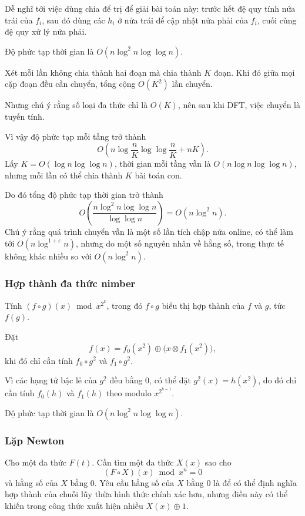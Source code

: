 \documentclass[11pt]{article}
\begin{document}
Dễ nghĩ tới việc dùng chia để trị để giải bài toán này: trước hết đệ quy tính
nửa trái của \(f_i\), sau đó dùng các \(h_i\) ở nửa trái để cập nhật nửa phải
của \(f_i\), cuối cùng đệ quy xử lý nửa phải.

Độ phức tạp thời gian là \(O(n\log^2 n\log\log n)\).

Xét mỗi lần không chia thành hai đoạn mà chia thành \(K\) đoạn. Khi đó giữa mọi
cặp đoạn đều cần chuyển, tổng cộng \(O(K^2)\) lần chuyển.

Nhưng chú ý rằng số loại đa thức chỉ là \(O(K)\), nên sau khi DFT, việc chuyển
là tuyến tính.

Vì vậy độ phức tạp mỗi tầng trở thành
\[
  O\left(n\log\frac nK\log\log\frac nK+nK\right).
\]
Lấy \(K=O(\log n\log\log n)\), thời gian mỗi tầng vẫn là \(O(n\log n\log\log n)\),
nhưng mỗi lần có thể chia thành \(K\) bài toán con.

Do đó tổng độ phức tạp thời gian trở thành
\[
  O\left(\frac{n\log^2 n\log\log n}{\log\log n}\right)=O(n\log^2 n).
\]
Chú ý rằng quá trình chuyển vẫn là một số lần tích chập nửa online, có thể làm
tới \(O(n\log^{1+\varepsilon} n)\), nhưng do một số nguyên nhân về hằng số, trong
thực tế không khác nhiều so với \(O(n\log^2 n)\).

\subsubsection{Hợp thành đa thức nimber}

Tính \((f\circ g)(x)\bmod x^{2^k}\), trong đó \(f\circ g\) biểu thị hợp thành
của \(f\) và \(g\), tức \(f(g)\).

Đặt
\[
  f(x)=f_0(x^2)\oplus\bigl(x\otimes f_1(x^2)\bigr),
\]
khi đó chỉ cần tính \(f_0\circ g^2\) và \(f_1\circ g^2\).

Vì các hạng tử bậc lẻ của \(g^2\) đều bằng \(0\), có thể đặt \(g^2(x)=h(x^2)\),
do đó chỉ cần tính \(f_0(h)\) và \(f_1(h)\) theo modulo \(x^{2^{k-1}}\).

Độ phức tạp thời gian là \(O(n\log^2 n\log\log n)\).

\subsubsection{Lặp Newton}

Cho một đa thức \(F(t)\). Cần tìm một đa thức \(X(x)\) sao cho
\[
  (F\circ X)(x)\bmod x^n=0
\]
và hằng số của \(X\) bằng \(0\). Yêu cầu hằng số của \(X\) bằng \(0\) là để có
thể định nghĩa hợp thành của chuỗi lũy thừa hình thức chính xác hơn, nhưng điều
này có thể khiến trong công thức xuất hiện nhiều \(X(x)\oplus 1\).
\end{document}

